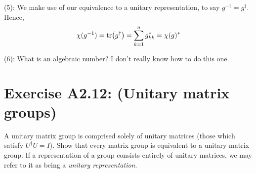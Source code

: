 \documentclass{book}
\begin{document}
    (5): We make use of our equivalence to a unitary representation, to say $g^{-1} = g^\dagger$. Hence,
    \begin{align}
        \chi(g^{-1}) = \tr(g^\dagger) = \sum_{k=1}^n g_{kk}^* = \chi(g)^*
    \end{align}
    
    (6): What is an algebraic number? I don't really know how to do this one.
    
\section*{Exercise A2.12: (Unitary matrix groups)}
    A unitary matrix group is comprised solely of unitary matrices (those which satisfy $U^\dagger U = I$). Show that every matrix group is equivalent to a unitary matrix group. If a representation of a group consists entirely of unitary matrices, we may refer to it as being a \emph{unitary representation}.
    
\end{document}
